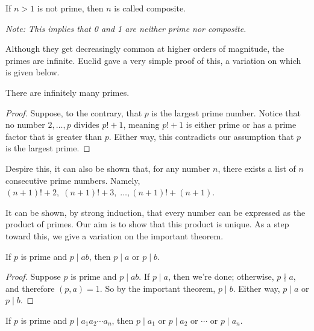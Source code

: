 \documentclass[../m55main.tex]{subfiles}
\begin{document}
\begin{definition}
    If $n > 1$ is not prime, then $n$ is called composite.

    \medskip
    \textit{Note: This implies that 0 and 1 are neither prime nor composite.}
\end{definition}

Although they get decreasingly common at higher orders of magnitude, the primes are infinite.
Euclid gave a very simple proof of this, a variation on which is given below.

\begin{theorem}
    There are infinitely many primes.
\end{theorem}

\begin{proof}
    Suppose, to the contrary, that $p$ is the largest prime number.
    Notice that no number $2, \ldots, p$ divides $p! + 1$, meaning $p! + 1$ is either prime or has a prime factor that is greater than $p$.
    Either way, this contradicts our assumption that $p$ is the largest prime.
\end{proof}

Despire this, it can also be shown that, for any number $n$, there exists a list of $n$ consecutive prime numbers.
Namely, $(n+1)! + 2, \; (n+1)! + 3, \; \ldots, (n+1)! + (n+1)$.

It can be shown, by strong induction, that every number can be expressed as the product of primes.
Our aim is to show that this product is unique.
As a step toward this, we give a variation on the important theorem.

\begin{theorem}
    If $p$ is prime and $p \mid ab$, then $p \mid a$ or $p \mid b$.
\end{theorem}

\begin{proof}
    Suppose $p$ is prime and $p \mid ab$.
    If $p \mid a$, then we're done; otherwise, $p \nmid a$, and therefore $(p,a) = 1$.
    So by the important theorem, $p \mid b$.
    Either way, $p \mid a$ or $p \mid b$.
\end{proof}

\begin{corollary}
    If $p$ is prime and $p \mid a_1 a_2 \cdots a_n$, then $p \mid a_1$ or $p \mid a_2$ or $\cdots$ or $p \mid a_n$.
\end{corollary}

\end{document}
